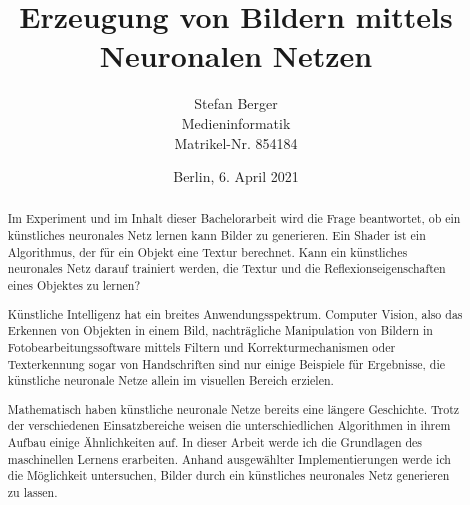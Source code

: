 \titlehead{Berliner Hochschule für Technik Berlin\\Fachbereich VI -- Informatik und Medien}
\subject{Bachelorarbeit}
\title{Erzeugung von Bildern mittels Neuronalen Netzen}
\author{Stefan Berger\\Medieninformatik\\Matrikel-Nr. 854184}
\date{Berlin, 6. April 2021}

\publishers{Betreut von: Prof.~Dr.~F.~Gers \\
\bigskip Gutachter: Prof.~Dr.~J.~Schimkat}


\maketitle

\begin{abstract}
\vspace{\baselineskip}
Im Experiment und im Inhalt dieser Bachelorarbeit wird die Frage beantwortet, ob ein künstliches neuronales Netz lernen kann Bilder zu generieren. Ein Shader ist ein Algorithmus, der für ein Objekt eine Textur berechnet. Kann ein künstliches neuronales Netz darauf trainiert werden, die Textur und die Reflexionseigenschaften eines Objektes zu lernen?

Künstliche Intelligenz hat ein breites Anwendungsspektrum. Computer Vision, also das Erkennen von Objekten in einem Bild, nachträgliche Manipulation von Bildern in Fotobearbeitungssoftware mittels Filtern und Korrekturmechanismen oder Texterkennung sogar von Handschriften sind nur einige Beispiele für Ergebnisse, die künstliche neuronale Netze allein im visuellen Bereich erzielen.

Mathematisch haben künstliche neuronale Netze bereits eine längere Geschichte. Trotz der verschiedenen Einsatzbereiche weisen die unterschiedlichen Algorithmen in ihrem Aufbau einige Ähnlichkeiten auf. In dieser Arbeit werde ich die Grundlagen des maschinellen Lernens erarbeiten. Anhand ausgewählter Implementierungen werde ich die Möglichkeit untersuchen, Bilder durch ein künstliches neuronales Netz generieren zu lassen.

\end{abstract}

